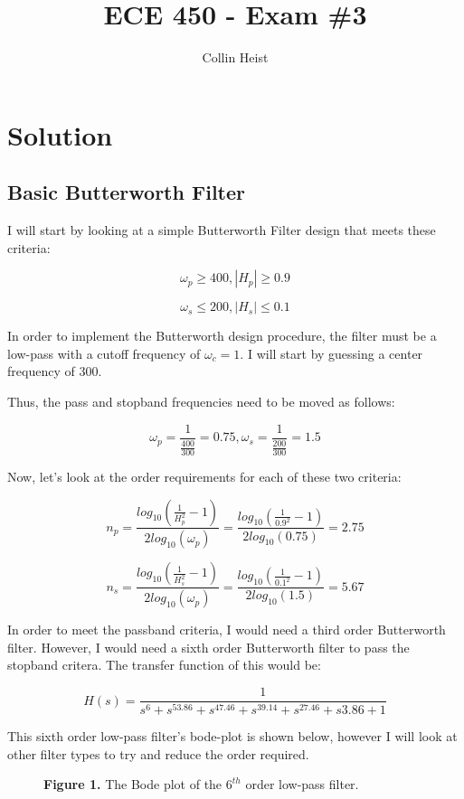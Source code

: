 \documentclass[11pt]{article}
\author{Collin Heist}
\title{ECE 450 - Exam \#3}
\begin{document}
    
    
    \maketitle
    
    \section{Solution}
\subsection{Basic Butterworth Filter}
I will start by looking at a simple Butterworth Filter design that meets these criteria:

\[\omega _p \geq 400, |H_p|\geq 0.9\]

\[\omega _s \leq 200, |H_s|\leq 0.1\]

In order to implement the Butterworth design procedure, the filter must
be a low-pass with a cutoff frequency of \(\omega _c = 1\). I will start
by guessing a center frequency of 300.

Thus, the pass and stopband frequencies need to be moved as follows:

\[\omega _p = \frac{1}{\frac{400}{300}}=0.75, \omega _s =\frac{1}{\frac{200}{300}}=1.5\]

Now, let's look at the order requirements for each of these two
criteria:

\[n_p=\frac{log_{10}(\frac{1}{H_p^2}-1)}{2log_{10}(\omega _p)}=\frac{log_{10}(\frac{1}{0.9^2}-1)}{2log_{10}(0.75)}=2.75\]

\[n_s=\frac{log_{10}(\frac{1}{H_s^2}-1)}{2log_{10}(\omega _p)}=\frac{log_{10}(\frac{1}{0.1^2}-1)}{2log_{10}(1.5)}=5.67\]

In order to meet the passband criteria, I would need a third order Butterworth filter. However, I would need a sixth order Butterworth filter to pass the stopband critera. The transfer function of this would be:

$$H(s)=\frac{1}{s^6+s^53.86+s^47.46+s^39.14+s^27.46+s3.86+1}$$

This sixth order low-pass filter's bode-plot is shown below, however I will look at other filter types to try and reduce the order required.

\begin{figure}[H]
\begin{center}
\caption{\textbf{Figure 1.} The Bode plot of the $6^{th}$ order low-pass filter.}
\end{center}
\end{figure}
\end{document}
